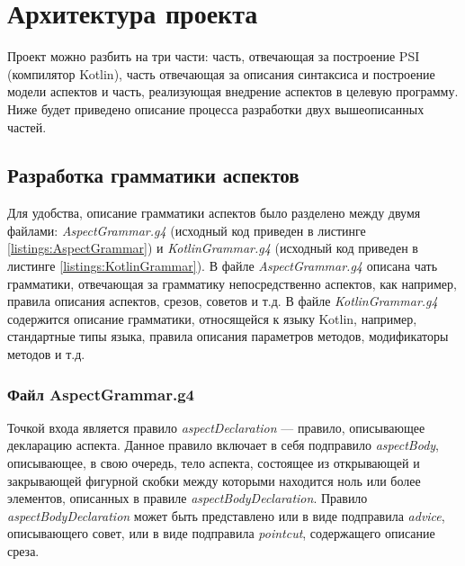 \section{Архитектура проекта}
\label{sec:project_structure}
Проект можно разбить на три части: часть, отвечающая за построение PSI (компилятор Kotlin), часть отвечающая за описания синтаксиса и построение модели аспектов и часть, реализующая внедрение аспектов в целевую программу.
Ниже будет приведено описание процесса разработки двух вышеописанных частей.
\subsection{Разработка грамматики аспектов}
\label{sub:aspect_grammar_part_development}
Для удобства, описание грамматики аспектов было разделено между двумя файлами:
\textit{AspectGrammar.g4} (исходный код приведен в листинге
\ref{listings:AspectGrammar}) и \textit{KotlinGrammar.g4} (исходный код
приведен в листинге \ref{listings:KotlinGrammar}).
В файле \textit{AspectGrammar.g4} описана чать грамматики, отвечающая за
грамматику непосредственно аспектов, как например, правила описания аспектов,
срезов, советов и т.д.
В файле \textit{KotlinGrammar.g4} содержится описание грамматики, относящейся к
языку Kotlin, например, стандартные типы языка, правила описания параметров
методов, модификаторы методов и т.д.
\subsubsection{Файл AspectGrammar.g4}
\label{ssub:aspect_grammar_g4}
Точкой входа является правило \textit{aspectDeclaration} --- правило,
описывающее декларацию аспекта.
Данное правило включает в себя подправило \textit{aspectBody}, описывающее, в
свою очередь, тело аспекта, состоящее из открывающей и закрывающей фигурной
скобки между которыми находится ноль или более элементов, описанных в правиле
\textit{aspectBodyDeclaration}.
Правило \textit{aspectBodyDeclaration} может быть представлено или в виде
подправила \textit{advice}, описывающего совет, или в виде подправила
\textit{pointcut}, содержащего описание среза.

